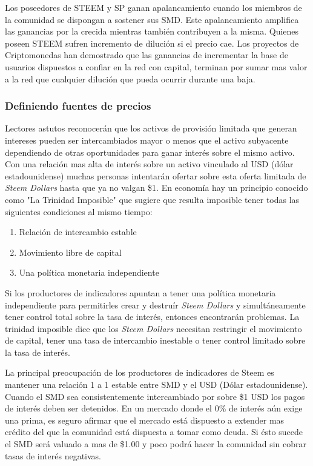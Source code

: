\documentclass[a4paper,titlepage,final]{article}
\begin{document}
Los poseedores de STEEM y SP ganan apalancamiento cuando los miembros de la comunidad se dispongan a sostener sus SMD. Este apalancamiento amplifica las ganancias por la crecida mientras también contribuyen a la misma. Quienes poseen STEEM sufren incremento de dilución si el precio cae. Los proyectos de Criptomonedas han demostrado que las ganancias de incrementar la base de usuarios dispuestos a confiar en la red con capital, terminan por sumar mas valor a la red que cualquier dilución que pueda ocurrir durante una baja.

\subsubsection{Definiendo fuentes de precios}

Lectores astutos reconocerán que los activos de provisión limitada que generan intereses pueden ser intercambiados mayor o menos que el activo subyacente dependiendo de otras oportunidades para ganar interés sobre el mismo activo. Con una relación mas alta de interés sobre un activo vinculado al USD (dólar estadounidense) muchas personas intentarán ofertar sobre esta oferta limitada de \textit{Steem Dollars} hasta que ya no valgan \$1. En economía hay un principio conocido como "La Trinidad Imposible"\cite{4} que sugiere que resulta imposible tener todas las siguientes condiciones al mismo tiempo:

\begin{enumerate}
\item Relación de intercambio estable
\item Movimiento libre de capital
\item Una política monetaria independiente
\end{enumerate}

Si los productores de indicadores apuntan a tener una política monetaria independiente para permitirles crear y destruír \textit{Steem Dollars} y simultáneamente tener control total sobre la tasa de interés, entonces encontrarán problemas. La trinidad imposible dice que los \textit{Steem Dollars} necesitan restringir el movimiento de capital, tener una tasa de intercambio inestable o tener control limitado sobre la tasa de interés.

La principal preocupación de los productores de indicadores de Steem es mantener una relación 1 a 1 estable entre SMD y el USD (Dólar estadounidense). Cuando el SMD sea consistentemente intercambiado por sobre \$1 USD los pagos de interés deben ser detenidos. En un mercado donde el 0\% de interés aún exige una prima, es seguro afirmar que el mercado está dispuesto a extender mas crédito del que la comunidad está dispuesta a tomar como deuda. Si ésto sucede el SMD será valuado a mas de \$1.00 y poco podrá hacer la comunidad sin cobrar tasas de interés negativas.
\end{document}
